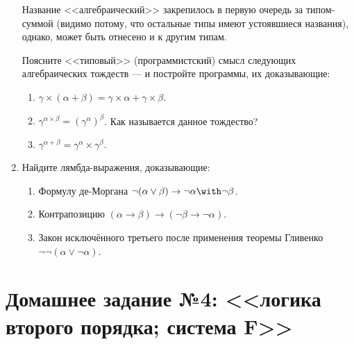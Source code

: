 \documentclass[10pt,a4paper,oneside]{article}
\begin{document}
\begin{enumerate}
Название <<алгебраический>> закрепилось в первую очередь за типом-суммой (видимо потому,
что остальные типы имеют устоявшиеся названия), однако, может быть отнесено и к другим
типам.

Поясните <<типовый>> (программистский) смысл следующих алгебраических тождеств --- и постройте
программы, их доказывающие:
\begin{enumerate}
\item $\gamma\times(\alpha+\beta) = \gamma\times\alpha + \gamma\times\beta$.
\item $\gamma^{\alpha\times\beta} = {(\gamma^\alpha)}^\beta$. Как называется данное тождество?
\item $\gamma^{\alpha+\beta} = \gamma^\alpha\times\gamma^\beta$.
\end{enumerate}

\item Найдите лямбда-выражения, доказывающие:
\begin{enumerate}
\item Формулу де-Моргана $\neg(\alpha\vee\beta)\to\neg\alpha\with\neg\beta$.
\item Контрапозицию $(\alpha\to\beta)\to(\neg\beta\to\neg\alpha)$.
\item Закон исключённого третьего после применения теоремы Гливенко $\neg\neg(\alpha\vee\neg\alpha)$.
\end{enumerate}

\end{enumerate}

\section*{Домашнее задание №4: <<логика второго порядка; система F>>}
\end{document}
